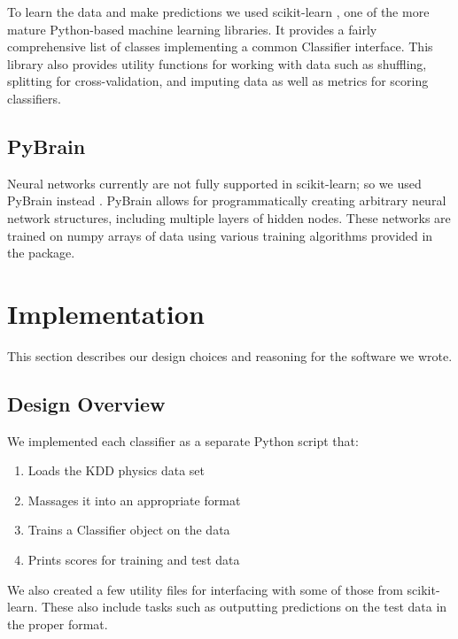 \documentclass{article}
\begin{document}

To learn the data and make predictions we used scikit-learn \cite{pedregosa2011scikit}, one of the more mature Python-based machine learning libraries.
It provides a fairly comprehensive list of classes implementing a common Classifier interface.
This library also provides utility functions for working with data such as shuffling, splitting for cross-validation, and imputing data as well as metrics for scoring classifiers.

\subsection{PyBrain}

Neural networks currently are not fully supported in scikit-learn; so we used PyBrain instead \cite{schaul2010}.
PyBrain allows for programmatically creating arbitrary neural network structures, including multiple layers of hidden nodes.
These networks are trained on numpy arrays of data using various training algorithms provided in the package.


\section{Implementation}
\label{implementation}

This section describes our design choices and reasoning for the software we wrote.

\subsection{Design Overview}

We implemented each classifier as a separate Python script that:
\begin{enumerate}
\item Loads the KDD physics data set
\item Massages it into an appropriate format
\item Trains a Classifier object on the data
\item Prints scores for training and test data


\end{enumerate}

We also created a few utility files for interfacing with some of those from scikit-learn.
These also include tasks such as outputting predictions on the test data in the proper format.
\end{document}
